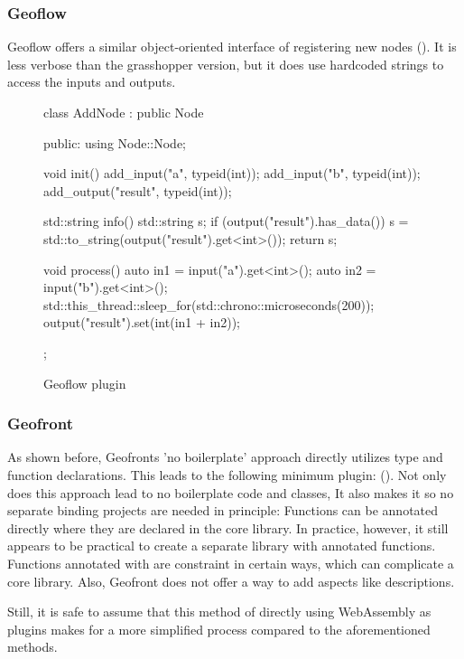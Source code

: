 \subsubsection{Geoflow}

Geoflow offers a similar object-oriented interface of registering new nodes (). 
It is less verbose than the grasshopper version, but it does use hardcoded strings to access the inputs and outputs.

\begin{figure}
\centering
\begin{code}
class AddNode : public Node
{
public:
  using Node::Node;

  void init()
  {
    add_input("a", typeid(int));
    add_input("b", typeid(int));
    add_output("result", typeid(int));
  }

  std::string info()
  {
    std::string s;
    if (output("result").has_data())
      s = std::to_string(output("result").get<int>());
    return s;
  }

  void process()
  {
    auto in1 = input("a").get<int>();
    auto in2 = input("b").get<int>();
    std::this_thread::sleep_for(std::chrono::microseconds(200));
    output("result").set(int(in1 + in2));
  }
};
\end{code}
\caption[]{Geoflow plugin}
\label{fig:boilerplate:geoflow}
\end{figure}

\subsubsection{Geofront}

As shown before, Geofronts 'no boilerplate' approach directly utilizes type and function declarations.
This leads to the following minimum plugin: ().
Not only does this approach lead to no boilerplate code and classes, It also makes it so no separate binding projects are needed in principle: 
Functions can be annotated directly where they are declared in the core library. 
In practice, however, it still appears to be practical to create a separate library with annotated functions. 
Functions annotated with  are constraint in certain ways, which can complicate a core library.
Also, Geofront does not offer a way to add aspects like descriptions. 

Still, it is safe to assume that this method of directly using WebAssembly as plugins makes for a more simplified process compared to the aforementioned methods.

